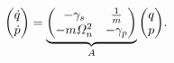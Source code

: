 \begin{equation}
    \mqty(\dot{q}\\\dot{p}) = \underbrace{\mqty(-\gamma_s & \frac{1}{m} \\ -m\Omega_n^2 & - \gamma_p)}_A \mqty(q \\ p).
    \label{eq:ddho_eom}
\end{equation}

